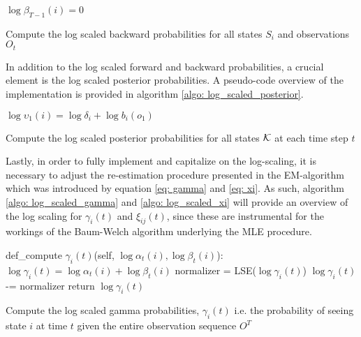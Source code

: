 \begin{algorithm}[H]
{$\log \beta_{T-1}(i) = 0$} \;


\caption{Compute the log scaled backward probabilities for all states $S_i$ and observations $O_t$}
\label{algo: log_scaled_backward}
\end{algorithm}

In addition to the log scaled forward and backward probabilities, a crucial element is the log scaled posterior probabilities. A pseudo-code overview of the implementation is provided in algorithm \ref{algo: log_scaled_posterior}.

\begin{algorithm}[H]
{$\log \upsilon_1(i) = \log \delta_i + \log b_i(o_1)$}\;


\caption{Compute the log scaled posterior probabilities for all states $\operatorname{\mathcal{K}}$ at each time step $t$}
\label{algo: log_scaled_posterior}
\end{algorithm}

Lastly, in order to fully implement and capitalize on the log-scaling, it is necessary to adjust the re-estimation procedure presented in the EM-algorithm which was introduced by equation \ref{eq: gamma} and \ref{eq: xi}. As such, algorithm \ref{algo: log_scaled_gamma} and \ref{algo: log_scaled_xi} will provide an overview of the log scaling for $\gamma_i(t)$ and $\xi_{ij}(t)$, since these are instrumental for the workings of the Baum-Welch algorithm underlying the MLE procedure.

\begin{algorithm}[H]
def\_compute $\gamma_i(t)$(self, $\log\alpha_t(i), \log\beta_t(i)$): \;
\Indp 
$\log\gamma_i(t) = \log\alpha_t(i) + \log\beta_t(i)$ \;
normalizer = LSE($\log\gamma_i(t)$) \;
$\log\gamma_i(t)$ -= normalizer \;
\BlankLine
return $\log\gamma_i(t)$
\caption{Compute the log scaled gamma probabilities, $\gamma_i(t)$ i.e. the probability of seeing state $i$ at time $t$ given the entire observation sequence $O^T$}
\label{algo: log_scaled_gamma}
\end{algorithm}

